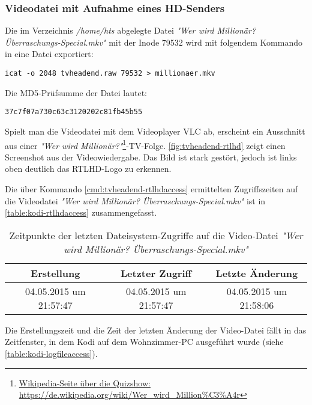 \subsubsection{Videodatei mit Aufnahme eines HD-Senders}

Die im Verzeichnis \textit{/home/hts} abgelegte Datei \textit{"Wer wird Millionär? Überraschungs-Special.mkv"} mit der Inode 79532 wird mit folgendem Kommando in eine Datei exportiert:

\begin{verbatim}
icat -o 2048 tvheadend.raw 79532 > millionaer.mkv
\end{verbatim}

Die MD5-Prüfsumme der Datei lautet:

\begin{verbatim}
37c7f07a730c63c3120202c81fb45b55
\end{verbatim}

Spielt man die Videodatei mit dem Videoplayer VLC ab, erscheint ein Ausschnitt aus einer \textit{"Wer wird 	Millionär?"}\footnote{\href{https://de.wikipedia.org/wiki/Wer\_wird\_Million\%C3\%A4r}{Wikipedia-Seite über die Quizshow: https://de.wikipedia.org/wiki/Wer\_wird\_Million\%C3\%A4r}}-TV-Folge. \autoref{fig:tvheadend-rtlhd} zeigt einen Screenshot aus der Videowiedergabe. Das Bild ist stark gestört, jedoch ist links oben deutlich das RTLHD-Logo zu erkennen.

Die über Kommando \autoref{cmd:tvheadend-rtlhdaccess} ermittelten Zugriffszeiten auf die Videodatei \textit{"Wer wird Millionär? Überraschungs-Special.mkv"} ist in \autoref{table:kodi-rtlhdaccess} zusammengefasst.

\begin{table}[H]
\begin{tabular}{ccc}
\hline 
Erstellung & Letzter Zugriff & Letzte Änderung \\ 
\hline 
04.05.2015 um 21:57:47 & 04.05.2015 um 21:57:47 & 04.05.2015 um 21:58:06 \\ 
\hline 
\end{tabular}
\caption{Zeitpunkte der letzten Dateisystem-Zugriffe auf die Video-Datei \textit{"Wer wird Millionär? Überraschungs-Special.mkv"}}
\label{table:kodi-rtlhdaccess}
\end{table}

Die Erstellungszeit und die Zeit der letzten Änderung der Video-Datei fällt in das Zeitfenster, in dem Kodi auf dem Wohnzimmer-PC ausgeführt wurde (siehe \autoref{table:kodi-logfileaccess}). 

